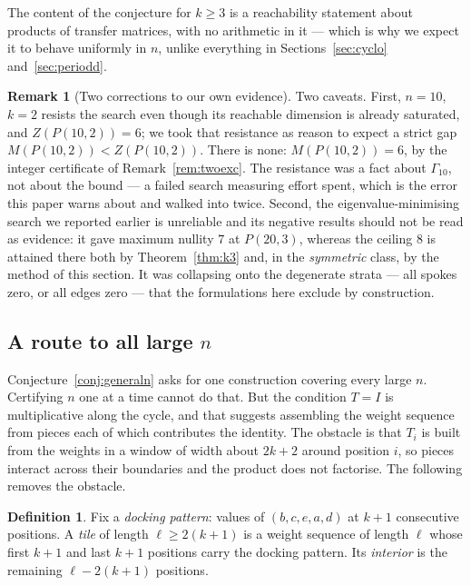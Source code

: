 \documentclass[11pt]{article}
\theoremstyle{definition}
\newtheorem{remark}[theorem]{Remark}
\newtheorem{definition}[theorem]{Definition}
\begin{document}
\noindent
The content of the conjecture for $k\ge3$ is a reachability statement about
products of transfer matrices, with no arithmetic in it --- which is why we
expect it to behave uniformly in $n$, unlike everything in
Sections~\ref{sec:cyclo} and~\ref{sec:periodd}.

\begin{remark}[Two corrections to our own evidence]
Two caveats. First, $n=10$, $k=2$ resists the search even though its reachable
dimension is already saturated, and $Z(P(10,2))=6$; we took that resistance as
reason to expect a strict gap $M(P(10,2))<Z(P(10,2))$. There is none:
$M(P(10,2))=6$, by the integer certificate of
Remark~\ref{rem:twoexc}. The resistance was a fact about $\Gamma_{10}$, not
about the bound --- a failed search measuring effort spent, which is the error
this paper warns about and walked into twice. Second, the
eigenvalue-minimising search we reported earlier is unreliable and its negative
results should not be read as evidence: it gave maximum nullity $7$ at
$P(20,3)$, whereas the ceiling $8$ is attained there both by
Theorem~\ref{thm:k3} and, in the \emph{symmetric} class, by the method of this
section. It was collapsing onto the degenerate strata --- all spokes zero, or
all edges zero --- that the formulations here exclude by construction.
\end{remark}

\subsection*{A route to all large $n$}
Conjecture~\ref{conj:generaln} asks for one construction covering every large
$n$. Certifying $n$ one at a time cannot do that. But the condition $T=I$ is
multiplicative along the cycle, and that suggests assembling the weight sequence
from pieces each of which contributes the identity. The obstacle is that $T_i$ is
built from the weights in a window of width about $2k+2$ around position $i$, so
pieces interact across their boundaries and the product does not factorise. The
following removes the obstacle.

\begin{definition}
Fix a \emph{docking pattern}: values of $(b,c,e,a,d)$ at $k+1$ consecutive
positions. A \emph{tile} of length $\ell\ge2(k+1)$ is a weight sequence of
length $\ell$ whose first $k+1$ and last $k+1$ positions carry the docking
pattern. Its \emph{interior} is the remaining $\ell-2(k+1)$ positions.
\end{definition}
\end{document}
